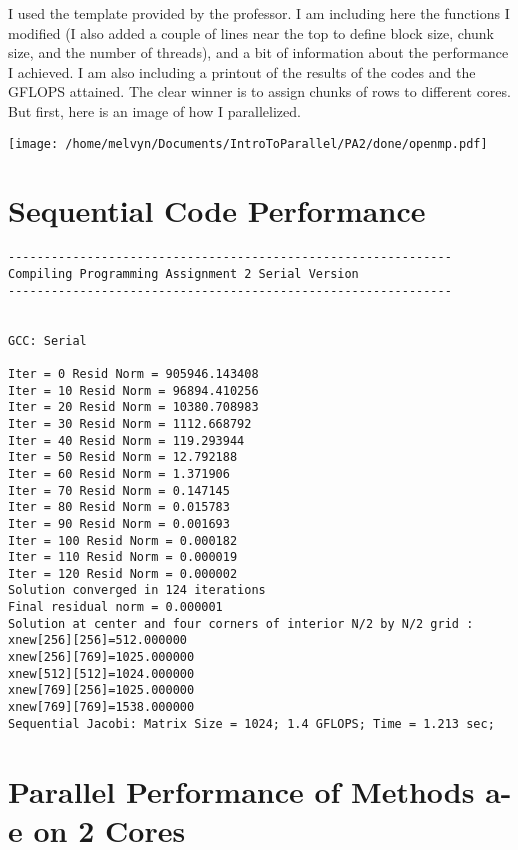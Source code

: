 \documentclass[11pt]{article}
\begin{document}
I used the template provided by the professor. I am including here the functions I modified (I also added a couple of lines near the top to define block size, chunk size, and the number of threads), and a bit of information about the performance I achieved. I am also including a printout of the results of the codes and the GFLOPS attained. The clear winner is to assign chunks of rows to different cores.
But first, here is an image of how I parallelized.
\begin{center}
\texttt{[image: /home/melvyn/Documents/IntroToParallel/PA2/done/openmp.pdf]}
\end{center}
\section{Sequential Code Performance}
 \begin{lstlisting}
--------------------------------------------------------------
Compiling Programming Assignment 2 Serial Version
--------------------------------------------------------------
 
 
GCC: Serial
 
Iter = 0 Resid Norm = 905946.143408
Iter = 10 Resid Norm = 96894.410256
Iter = 20 Resid Norm = 10380.708983
Iter = 30 Resid Norm = 1112.668792
Iter = 40 Resid Norm = 119.293944
Iter = 50 Resid Norm = 12.792188
Iter = 60 Resid Norm = 1.371906
Iter = 70 Resid Norm = 0.147145
Iter = 80 Resid Norm = 0.015783
Iter = 90 Resid Norm = 0.001693
Iter = 100 Resid Norm = 0.000182
Iter = 110 Resid Norm = 0.000019
Iter = 120 Resid Norm = 0.000002
Solution converged in 124 iterations
Final residual norm = 0.000001
Solution at center and four corners of interior N/2 by N/2 grid : 
xnew[256][256]=512.000000
xnew[256][769]=1025.000000
xnew[512][512]=1024.000000
xnew[769][256]=1025.000000
xnew[769][769]=1538.000000
Sequential Jacobi: Matrix Size = 1024; 1.4 GFLOPS; Time = 1.213 sec; 
\end{lstlisting}

\section{Parallel Performance of Methods a-e on 2 Cores}
\end{document}
